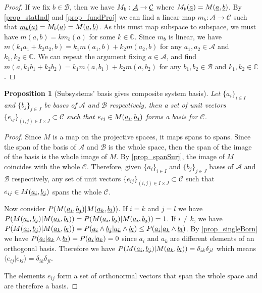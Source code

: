 \documentclass[aps,prl,amsmath,amssymb,twocolumn,nofootinbib]{revtex4}
\theoremstyle{plain}
\newtheorem{prop}[thrm]{Proposition}
\theoremstyle{definition}
\theoremstyle{remark}
\newcommand{\pj}[1] {\underbar{$#1$}}
\def\>{\rangle}
\def\<{\langle}
\begin{document}
	\begin{proof}
		If we fix $b \in \mathcal{B}$, then we have $M_b : \pj{\mathcal{A}} \to \pj{\mathcal{C}}$ where $M_b(\pj{a}) = M(\pj{a}, \pj{b})$. By \ref{prop_statInd} and \ref{prop_fundProj} we can find a linear map $m_b : \mathcal{A} \to \mathcal{C}$ such that $\pj{m_b(a)} = M_b(\pj{a}) = M(\pj{a}, \pj{b})$. As this must map subspace to subspace, we must have $m(a, b) = k m_b(a)$ for some $k \in \mathbb{C}$. Since $m_b$ is linear, we have $m(k_1a_1 + k_2a_2, b)=k_1m(a_1, b) + k_2m(a_2, b)$ for any $a_1, a_2 \in \mathcal{A}$ and $k_1, k_2 \in \mathbb{C}$. We can repeat the argument fixing $a \in \mathcal{A}$, and find $m(a, k_1b_1 + k_2b_2)=k_1m(a, b_1) + k_2m(a, b_2)$ for any $b_1, b_2 \in \mathcal{B}$ and $k_1, k_2 \in \mathbb{C}$.
	\end{proof}
	
	\begin{prop}[Subsystems' basis gives composite system
		basis]\label{prop_basis}
		Let $\{a_i\}_{i\in I}$ and $\{b_j\}_{j \in J}$ be bases of $\mathcal{A}$ and $\mathcal{B}$ respectively, then a set of unit vectors $\{e_{ij}\}_{(i,j) \in I \times J} \subset \mathcal{C}$  such that $e_{ij} \in M(\underbar{$a_i$}, \underbar{$b_j$})$ forms a basis for $\mathcal{C}$.
	\end{prop}
	
	\begin{proof}
		
		Since $M$ is a map on the projective spaces, it maps spans to spans.
		Since the span of the basis of $\mathcal{A}$ and $\mathcal{B}$ is
		the whole space, then the span of the image of the basis is the
		whole image of $M$. By \ref{prop_spanSurj}, the image of $M$
		coincides with the whole $\mathcal{C}$. Therefore, given
		$\{a_i\}_{i\in I}$ and $\{b_j\}_{j \in J}$ bases of $\mathcal{A}$
		and $\mathcal{B}$ respectively, any set of unit vectors
		$\{e_{ij}\}_{(i,j) \in I \times J} \subset \mathcal{C}$ such that
		$e_{ij} \in M(\pj{a_i}, \pj{b_j})$ spans the whole $\mathcal{C}$.
		
		Now consider $P(M(\pj{a_i},\pj{b_j})|M(\pj{a_k},\pj{b_l}))$. If $i=k$ and $j=l$ we have $P(M(\pj{a_i},\pj{b_j})|M(\pj{a_k},\pj{b_l}))= P(M(\pj{a_i},\pj{b_j})|M(\pj{a_i},\pj{b_j})) = 1$. If $i\neq k$, we have $P(M(\pj{a_i},\pj{b_j})|M(\pj{a_k},\pj{b_l})) = P(\pj{a_i} \wedge \pj{b_j} | \pj{a_k} \wedge \pj{b_l}) \leq P(\pj{a_i} | \pj{a_k} \wedge \pj{b_l})$. By \ref{prop_singleBorn} we have $P(\pj{a_i} | \pj{a_k} \wedge \pj{b_l}) = P(\pj{a_i} | \pj{a_k}) = 0$ since $a_i$ and $a_k$ are different elements of an orthogonal basis. Therefore we have $P(M(\pj{a_i},\pj{b_j})|M(\pj{a_k},\pj{b_l}))=\delta_{ik}\delta_{jl}$ which means $\<e_{ij} | e_{kl} \> = \delta_{ik}\delta_{jl}$.
		
		The elements $e_{ij}$ form a set of orthonormal vectors that span the whole space and are therefore a basis.
	\end{proof}
	
\end{document}
